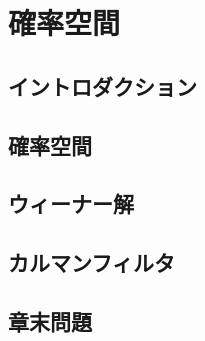 \documentclass[../../main]{subfiles}
\begin{document}
\chapter{確率空間}
\label{chapter:probability_space}

\section{イントロダクション}

\section{確率空間}

\section{ウィーナー解}

\section{カルマンフィルタ}

\section{章末問題}
\end{document}
